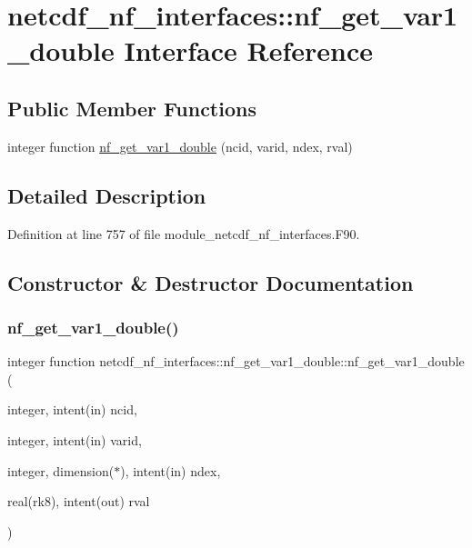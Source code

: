 \hypertarget{interfacenetcdf__nf__interfaces_1_1nf__get__var1__double}{}\section{netcdf\+\_\+nf\+\_\+interfaces\+:\+:nf\+\_\+get\+\_\+var1\+\_\+double Interface Reference}
\label{interfacenetcdf__nf__interfaces_1_1nf__get__var1__double}
\subsection*{Public Member Functions}
\begin{DoxyCompactItemize}
\item 
integer function \hyperlink{interfacenetcdf__nf__interfaces_1_1nf__get__var1__double_acfb2d5c6bb6e3679958b09f0007ed11d}{nf\+\_\+get\+\_\+var1\+\_\+double} (ncid, varid, ndex, rval)
\end{DoxyCompactItemize}


\subsection{Detailed Description}


Definition at line 757 of file module\+\_\+netcdf\+\_\+nf\+\_\+interfaces.\+F90.



\subsection{Constructor \& Destructor Documentation}
\mbox{\label{interfacenetcdf__nf__interfaces_1_1nf__get__var1__double_acfb2d5c6bb6e3679958b09f0007ed11d}} 
\subsubsection{\texorpdfstring{nf\+\_\+get\+\_\+var1\+\_\+double()}{nf\_get\_var1\_double()}}
{\footnotesize\ttfamily integer function netcdf\+\_\+nf\+\_\+interfaces\+::nf\+\_\+get\+\_\+var1\+\_\+double\+::nf\+\_\+get\+\_\+var1\+\_\+double (\begin{DoxyParamCaption}\item[{integer, intent(in)}]{ncid,  }\item[{integer, intent(in)}]{varid,  }\item[{integer, dimension($\ast$), intent(in)}]{ndex,  }\item[{real(rk8), intent(out)}]{rval }\end{DoxyParamCaption})}



